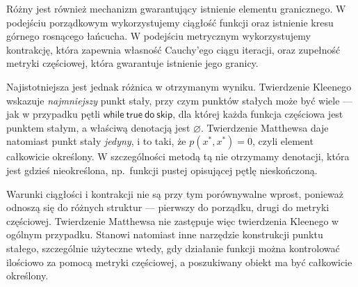 \documentclass[11pt,a4paper]{article}
\theoremstyle{definition}
\theoremstyle{plain}
\newcommand{\kw}[1]{\ensuremath{\mathsf{#1}}} %
\begin{document}
	Różny jest również mechanizm gwarantujący istnienie elementu
	granicznego. W podejściu porządkowym wykorzystujemy ciągłość funkcji
	oraz istnienie kresu górnego rosnącego łańcucha. W podejściu metrycznym
	wykorzystujemy kontrakcję, która zapewnia własność Cauchy'ego ciągu
	iteracji, oraz zupełność metryki częściowej, która gwarantuje istnienie
	jego granicy.
	
	Najistotniejsza jest jednak różnica w otrzymanym wyniku. Twierdzenie
	Kleenego wskazuje \emph{najmniejszy} punkt stały, przy czym punktów
	stałych może być wiele --- jak w przypadku pętli
	$\kw{while}\ \kw{true}\ \kw{do}\ \kw{skip}$, dla której każda funkcja
	częściowa jest punktem stałym, a właściwą denotacją jest
	$\varnothing$. Twierdzenie Matthewsa daje natomiast punkt stały
	\emph{jedyny}, i to taki, że $p(x^*,x^*)=0$, czyli element całkowicie
	określony. W szczególności metodą tą nie otrzymamy denotacji, która
	jest gdzieś nieokreślona, np.\ funkcji pustej opisującej pętlę
	nieskończoną.
	
	Warunki ciągłości i kontrakcji nie są przy tym porównywalne wprost,
	ponieważ odnoszą się do różnych struktur --- pierwszy do porządku,
	drugi do metryki częściowej. Twierdzenie Matthewsa nie zastępuje więc
	twierdzenia Kleenego w ogólnym przypadku. Stanowi natomiast inne
	narzędzie konstrukcji punktu stałego, szczególnie użyteczne wtedy,
	gdy działanie funkcji można kontrolować ilościowo za pomocą metryki
	częściowej, a poszukiwany obiekt ma być całkowicie określony.
\end{document}
